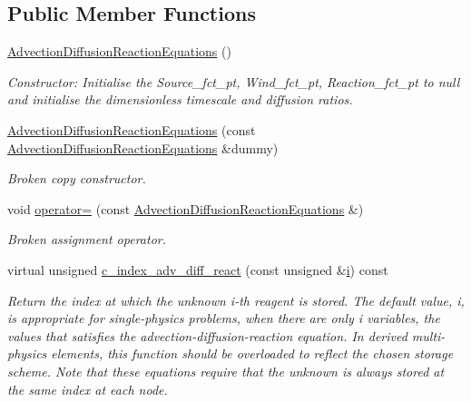 \subsection*{Public Member Functions}
\begin{DoxyCompactItemize}
\item 
\hyperlink{classoomph_1_1AdvectionDiffusionReactionEquations_a08b9a88de687860d51f0f811bfda46ce}{Advection\+Diffusion\+Reaction\+Equations} ()
\begin{DoxyCompactList}\small\item\em Constructor\+: Initialise the Source\+\_\+fct\+\_\+pt, Wind\+\_\+fct\+\_\+pt, Reaction\+\_\+fct\+\_\+pt to null and initialise the dimensionless timescale and diffusion ratios. \end{DoxyCompactList}\item 
\hyperlink{classoomph_1_1AdvectionDiffusionReactionEquations_a887f0a40932b1ca0aeb97cba56446a84}{Advection\+Diffusion\+Reaction\+Equations} (const \hyperlink{classoomph_1_1AdvectionDiffusionReactionEquations}{Advection\+Diffusion\+Reaction\+Equations} \&dummy)
\begin{DoxyCompactList}\small\item\em Broken copy constructor. \end{DoxyCompactList}\item 
void \hyperlink{classoomph_1_1AdvectionDiffusionReactionEquations_a79994ad90aba1dad5fb054d963e696be}{operator=} (const \hyperlink{classoomph_1_1AdvectionDiffusionReactionEquations}{Advection\+Diffusion\+Reaction\+Equations} \&)
\begin{DoxyCompactList}\small\item\em Broken assignment operator. \end{DoxyCompactList}\item 
virtual unsigned \hyperlink{classoomph_1_1AdvectionDiffusionReactionEquations_ad7564620f4b3313b09d2a3e675958e10}{c\+\_\+index\+\_\+adv\+\_\+diff\+\_\+react} (const unsigned \&\hyperlink{cfortran_8h_adb50e893b86b3e55e751a42eab3cba82}{i}) const
\begin{DoxyCompactList}\small\item\em Return the index at which the unknown i-\/th reagent is stored. The default value, i, is appropriate for single-\/physics problems, when there are only i variables, the values that satisfies the advection-\/diffusion-\/reaction equation. In derived multi-\/physics elements, this function should be overloaded to reflect the chosen storage scheme. Note that these equations require that the unknown is always stored at the same index at each node. \end{DoxyCompactList}\item 

\end{DoxyCompactItemize}

